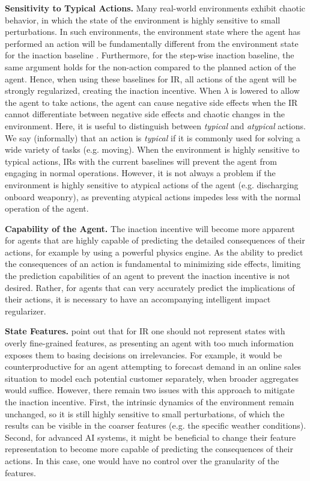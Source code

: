 \documentclass[letterpaper]{article} %
\begin{document}
\textbf{Sensitivity to Typical Actions.} Many real-world environments exhibit chaotic behavior, in which the state of the environment is highly sensitive to small perturbations. In such environments, the environment state where the agent has performed an action will be fundamentally different from the environment state for the inaction baseline \citep{armstrong2017low}. Furthermore, for the step-wise inaction baseline, the same argument holds for the non-action compared to the planned action of the agent. Hence, when using these baselines for IR, all actions of the agent will be strongly regularized, creating the inaction incentive. When $\lambda$ is lowered to allow the agent to take actions, the agent can cause negative side effects when the IR cannot differentiate between negative side effects and chaotic changes in the environment. Here, it is useful to distinguish between \emph{typical} and \emph{atypical} actions. We say (informally) that an action is \emph{typical} if it is commonly used for solving a wide variety of tasks (e.g. moving). When the environment is highly sensitive to typical actions, IRs with the current baselines will prevent the agent from engaging in normal operations. However, it is not always a problem if the environment is highly sensitive to atypical actions of the agent (e.g. discharging onboard weaponry), as preventing atypical actions impedes less with the normal operation of the agent.

\textbf{Capability of the Agent.} The inaction incentive will become more apparent for agents that are highly capable of predicting the detailed consequences of their actions, for example by using a powerful physics engine. As the ability to predict the consequences of an action is fundamental to minimizing side effects, limiting the prediction capabilities of an agent to prevent the inaction incentive is not desired. Rather, for agents that can very accurately predict the implications of their actions, it is necessary to have an accompanying intelligent impact regularizer.

\textbf{State Features.}
\citet{armstrong2017low} point out that for IR one should not represent states with overly fine-grained features, as presenting an agent with too much information exposes them to basing decisions on irrelevancies.
For example, it would be counterproductive for an agent attempting to forecast demand in an online sales situation to model each potential customer separately, when broader aggregates would suffice. However, there remain two issues with this approach to mitigate the inaction incentive. First, the intrinsic dynamics of the environment remain unchanged, so it is still highly sensitive to small perturbations, of which the results can be visible in the coarser features (e.g. the specific weather conditions). Second, for advanced AI systems, it might be beneficial to change their feature representation to become more capable of predicting the consequences of their actions. In this case, one would have no control over the granularity of the features.
\end{document}
